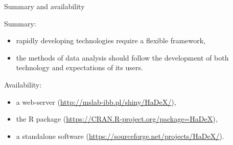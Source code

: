 \documentclass{beamer}\usepackage[]{graphicx}\usepackage[]{color}
\begin{document}
\begin{frame}{Summary and availability}

Summary:

\begin{itemize}
\item rapidly developing technologies require a flexible framework,
\item the methods of data analysis should follow the development of both technology and expectations of its users.
\end{itemize}

\medskip

Availability:

\begin{itemize}
\item a web-server (\url{http://mslab-ibb.pl/shiny/HaDeX/}), 
\item the R package (\url{https://CRAN.R-project.org/package=HaDeX}),
\item a standalone software (\url{https://sourceforge.net/projects/HaDeX/}).
\end{itemize}
\end{frame} 
\end{document}

